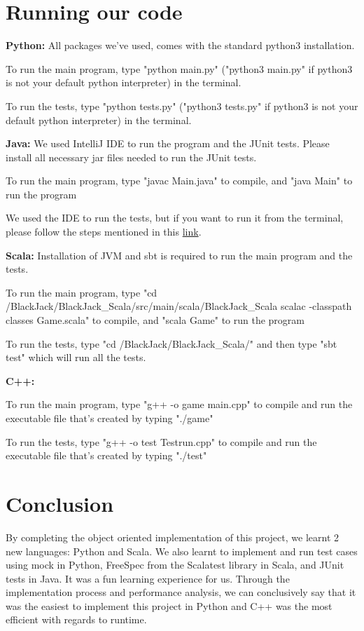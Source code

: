\documentclass[12pt]{article}
\begin{document}
\section{Running our code}

\textbf{Python:} All packages we've used, comes with the standard python3 installation.

To run the main program, type "python main.py" ("python3 main.py" if python3 is not your default python interpreter) in the terminal.

To run the tests, type "python tests.py" ("python3 tests.py" if python3 is not your default python interpreter) in the terminal.

\textbf{Java:} We used IntelliJ IDE to run the program and the JUnit tests. Please install all necessary jar files needed to run the JUnit tests. 

To run the main program, type "javac Main.java" to compile, and "java Main" to run the program

We used the IDE to run the tests, but if you want to run it from the terminal, please follow the steps mentioned in this \href{https://www.lambdatest.com/blog/run-junit-from-command-line/}{link}.

\textbf{Scala:} Installation of JVM and sbt is required to run the main program and the tests.

To run the main program, type "cd /BlackJack/BlackJack\_Scala/src/main/scala/BlackJack\_Scala
scalac -classpath classes Game.scala" to compile, and "scala Game" to run the program

To run the tests, type "cd /BlackJack/BlackJack\_Scala/" and then type "sbt test" which will run all the tests.

\textbf{C++:} 

To run the main program, type "g++ -o game main.cpp" to compile and run the executable file that's created by typing "./game"

To run the tests, type "g++ -o test Testrun.cpp" to compile and run the executable file that's created by typing "./test"

\section{Conclusion}

By completing the object oriented implementation of this project, we learnt 2 new languages: Python and Scala. We also learnt to implement and run test cases using mock in Python, FreeSpec from the Scalatest library in Scala, and JUnit tests in Java. It was a fun learning experience for us. Through the implementation process and performance analysis, we can conclusively say that it was the easiest to implement this project in Python and C++ was the most efficient with regards to runtime. 
\end{document}
